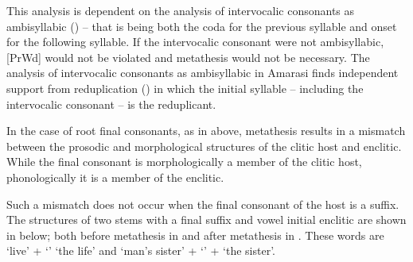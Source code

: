 This analysis is dependent on the analysis of intervocalic
consonants as ambisyllabic () --
that is being both the coda for the previous syllable
and onset for the following syllable.
If the intervocalic consonant were not ambisyllabic,
[PrWd] would not be violated
and metathesis would not be necessary.
The analysis of intervocalic consonants as ambisyllabic in Amarasi
finds independent support from reduplication ()
in which the initial syllable -- including the intervocalic consonant --
is the reduplicant.

In the case of root final consonants,
as in  above, metathesis results in a mismatch between the prosodic
and morphological structures of the clitic host and enclitic.
While the final consonant is morphologically a member of
the clitic host, phonologically it is a member of the enclitic.

Such a mismatch does not occur when the final
consonant of the host is a suffix.
The structures of two stems with a final suffix and vowel initial
enclitic are shown in  below;
both before metathesis in  and after metathesis in .
These words are  `live' +  `{\at}' {\ra}  `the life'
and  `man's sister' +  `{\F}' + {\ee} {\ra}  `the sister'.

